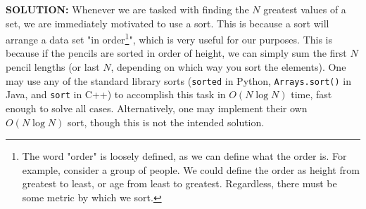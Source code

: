 \textbf{SOLUTION:}
\blank
Whenever we are tasked with finding the $N$ greatest values of a set, we are immediately motivated to use a sort.  This is because a sort will arrange a data set "in order\footnote{The word "order" is loosely defined, as we can define what the order is.  For example, consider a group of people.  We could define the order as height from greatest to least, or age from least to greatest.  Regardless, there must be some metric by which we sort.}", which is very useful for our purposes. This is because if the pencils are sorted in order of height, we can simply sum the first $N$ pencil lengths (or last $N$, depending on which way you sort the elements).
\blank
One may use any of the standard library sorts (\verb|sorted| in Python, \verb|Arrays.sort()| in Java, and \verb|sort| in C++) to accomplish this task in $O(N\log N)$ time, fast enough to solve all cases. Alternatively, one may implement their own $O(N \log N)$ sort, though this is not the intended solution.